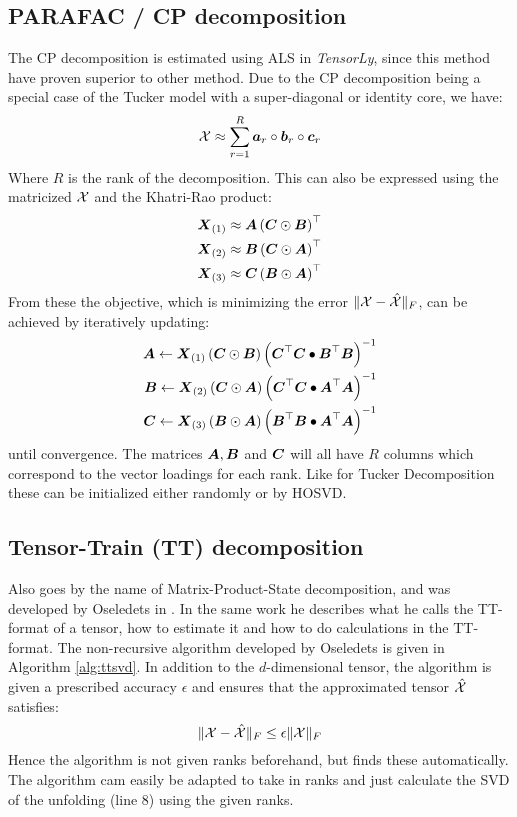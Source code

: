 \subsection{PARAFAC / CP decomposition}
The CP decomposition is estimated using ALS in \textit{TensorLy}, since this method have proven superior to other method\cite[29]{Mørup2011}. Due to the CP decomposition being a special case of the Tucker model with a super-diagonal or identity core, we have:
\begin{equation}
    \mathcal{X} \approx \sum_{r=1}^R \boldsymbol{a}_r \circ \boldsymbol{b}_r \circ \boldsymbol{c}_r
\end{equation}
Where $R$ is the rank of the decomposition. This can also be expressed using the matricized $\mathcal{X}$ and the Khatri-Rao product:
\begin{align}
    \boldsymbol{X}_{(1)} &\approx \boldsymbol{A}\left( \boldsymbol{C} \odot \boldsymbol{B}\right)^\top \\
    \boldsymbol{X}_{(2)} &\approx \boldsymbol{B}\left( \boldsymbol{C} \odot \boldsymbol{A}\right)^\top \\
    \boldsymbol{X}_{(3)} &\approx \boldsymbol{C}\left( \boldsymbol{B} \odot \boldsymbol{A}\right)^\top
\end{align}
From these the objective, which is minimizing the error $\| \mathcal{X} - \hat{\mathcal{X}}\|_F$, can be achieved by iteratively updating:
\begin{align}
    \boldsymbol{A} \leftarrow \boldsymbol{X}_{(1)}\left( \boldsymbol{C} \odot \boldsymbol{B} \right)\left(
    \boldsymbol{C}^\top \boldsymbol{C} \bullet \boldsymbol{B}^\top \boldsymbol{B}\right)^{-1} \\
    \boldsymbol{B} \leftarrow \boldsymbol{X}_{(2)}\left( \boldsymbol{C} \odot \boldsymbol{A} \right)\left(
    \boldsymbol{C}^\top \boldsymbol{C} \bullet \boldsymbol{A}^\top \boldsymbol{A}\right)^{-1} \\
    \boldsymbol{C} \leftarrow \boldsymbol{X}_{(3)}\left( \boldsymbol{B} \odot \boldsymbol{A} \right)\left(
    \boldsymbol{B}^\top \boldsymbol{B} \bullet \boldsymbol{A}^\top \boldsymbol{A}\right)^{-1}
\end{align}
until convergence\cite[28]{Kolda2007}. The matrices $\boldsymbol{A}, \boldsymbol{B}$ and $\boldsymbol{C}$ will all have $R$ columns which correspond to the vector loadings for each rank. Like for Tucker Decomposition these can be initialized either randomly or by HOSVD.

\subsection{Tensor-Train (TT) decomposition}
Also goes by the name of Matrix-Product-State decomposition, and was developed by Oseledets in \cite{Oseledets2011}. In the same work he describes what he calls the TT-format of a tensor, how to estimate it and how to do calculations in the TT-format. The non-recursive algorithm developed by Oseledets is given in Algorithm \ref{alg:ttsvd}. In addition to the $d$-dimensional tensor, the algorithm is given a prescribed accuracy $\epsilon$ and ensures that the approximated tensor $\hat{\mathcal{X}}$ satisfies:
\begin{equation}
    \| \mathcal{X}-\hat{\mathcal{X}} \|_F \leq \epsilon \| \mathcal{X} \|_F
\end{equation}
Hence the algorithm is not given ranks beforehand, but finds these automatically. The algorithm cam easily be adapted to take in ranks and just calculate the SVD of the unfolding (line 8) using the given ranks.

